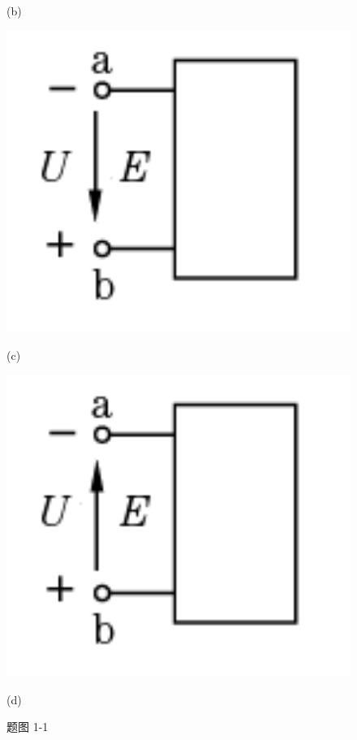 \documentclass[hyperref, UTF8]{ctexart}
\begin{document}
\begin{figure}[!htb]
\begin{minipage}[t]{0.146\textwidth}
    \caption*{(b)}
  \end{minipage}
  \begin{minipage}[t]{0.146\textwidth}
    \centering
    \includegraphics[width=1\textwidth]{p1-1-c.png}
    \caption*{(c)}
  \end{minipage}
  \begin{minipage}[t]{0.146\textwidth}
    \centering
    \includegraphics[width=1\textwidth]{p1-1-d.png}
    \caption*{(d)}
  \end{minipage}
  \caption*{题图 1-1}
\end{figure}
\end{document}
